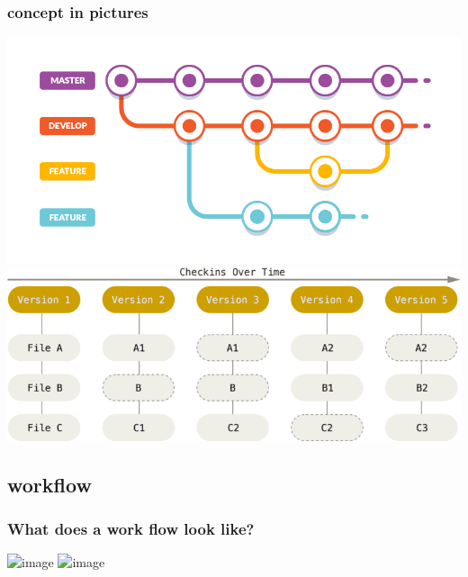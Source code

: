 \documentclass[hyperref={colorlinks=true}]{beamer}
\begin{document}

\begin{frame}%
  \frametitle{\git concept in pictures}
  
  \begin{center}
    \includegraphics[width=0.75\columnwidth]{GitFlow.png}\\
    \includegraphics[width=0.65\columnwidth]{GitCheckins.png}
  \end{center}
  
  
\end{frame}

\subsection[\git workflow]{\git workflow}

\begin{frame}%
  \frametitle{What does a \git work flow look like?}
  
  \begin{center}
    \includegraphics<1>[width=0.85\columnwidth]{GitHubWorkflow.png}%
    \includegraphics<2>[width=0.90\columnwidth]{GitHubWorkflow-commands.png}%
  \end{center}
  
  
\end{frame}

\end{document}
